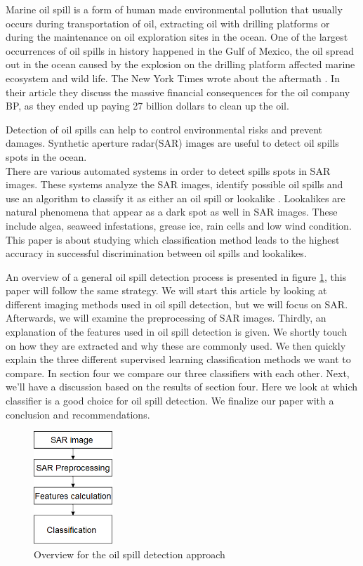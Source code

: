 Marine oil spill is a form of human made environmental pollution that usually occurs during transportation of oil, extracting oil with drilling platforms \cite{Zhang201476} or during the maintenance on oil exploration sites in the ocean. One of the largest occurrences of oil spills in history happened in the Gulf of Mexico, the oil spread out in the ocean caused by the explosion on the drilling platform affected marine ecosystem and wild life\cite{Bozeman2011244}. The New York Times wrote about the aftermath \cite{bpnytimes}. In their article they discuss the massive financial consequences for the oil company BP, as they ended up paying 27 billion dollars to clean up the oil.

Detection of oil spills can help to control environmental risks and prevent damages. Synthetic aperture radar(SAR) images are useful to detect oil spills spots in the ocean. \\
There are various automated systems in order to detect spills spots in SAR images. These systems analyze the SAR images, identify possible oil spills and use an algorithm to classify it as either an oil spill or lookalike \cite{Xu201414,brekke2008classifiers,Keramitsoglou2006640,Guo2014146}. Lookalikes are natural phenomena that appear as a dark spot as well in SAR images. These include algea, seaweed infestations, grease ice, rain cells and low wind condition. This paper is about studying which classification method leads to the highest accuracy in successful discrimination between oil spills and lookalikes.

An overview of a general oil spill detection process is presented in figure \ref{fig:oilspillapproach}, this paper will follow the same strategy. We will start this article by looking at different imaging methods used in oil spill detection, but we will focus on SAR. Afterwards, we will examine the preprocessing of SAR images. Thirdly, an explanation of the features used in oil spill detection is given. We shortly touch on how they are extracted and why these are commonly used. We then quickly explain the three different supervised learning classification methods we want to compare. In section four we compare our three classifiers with each other. Next, we'll have a discussion based on the results of section four. Here we look at which classifier is a good choice for oil spill detection. We finalize our paper with a conclusion and recommendations.

\begin{figure}[H]
	\centering
    \includegraphics[width=30mm,scale=0.2]{./img/basicsteps.png}
    \caption{\footnotesize{Overview for the oil spill detection approach}}
    \label{fig:oilspillapproach}
\end{figure}